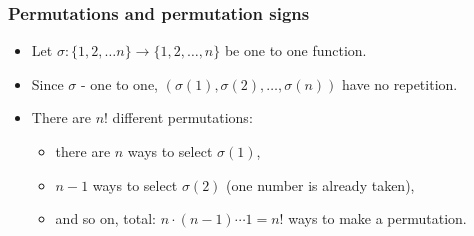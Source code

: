 \begin{frame}
\frametitle{Permutations and permutation signs}
\begin{itemize}
\item Let $\sigma: \{1,2,\dots n\}\to \{1,2,\dots, n\}$ be one to one function.
\item<2-> Since $\sigma $ - one to one, $\left(\sigma(1), \sigma(2), \dots, \sigma(n) \right)$ have no repetition.
\item<4-> There are $n!$ different permutations: 
\begin{itemize}
\item<5-> there are $n$ ways to select $\sigma(1)$,
\item<6-> $n-1$ ways to select $\sigma(2)$ (one number is already taken),
\item<7-> and so on,  total: $n \cdot (n-1)\cdots 1 =n!$ ways to make a permutation.
\end{itemize}
\end{itemize}
\end{frame}